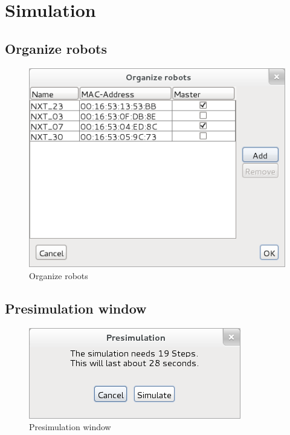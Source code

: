 \documentclass[%
  a4paper,%
  11pt,%
  blue,%
  hyperref	%
  ]{tubsartcl}
\begin{document}
\newpage

\section{Simulation}

\subsection{Organize robots}

\begin{figure}[!htb]
\begin{center}
\includegraphics[scale=0.45]{graphics_gui/organize_robots.png}
\end{center}
\caption{Organize robots}
\label{pic:organize_robots}
\end{figure}

\newpage

\subsection{Presimulation window}

\begin{figure}[!htb]
\begin{center}
\includegraphics[scale=0.4]{graphics_gui/presimulation.png}
\end{center}
\caption{Presimulation window}
\label{pic:presimulation}
\end{figure}
\end{document}
